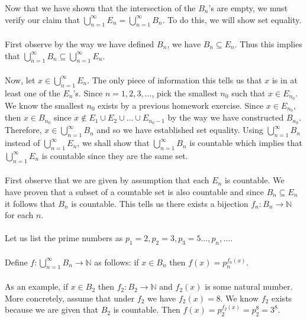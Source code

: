\documentclass[12pt]{article}
\begin{document}
Now that we have shown that the intersection of the $B_{n}$'s are empty, we must verify our claim that $\bigcup^{\infty}_{n=1} E_{n}=\bigcup^{\infty}_{n=1} B_{n}$. To do this, we will show set equality. \\ \\ 

First observe by the way we have defined $B_{n}$, we have $B_{n} \subseteq E_{n}$. Thus this implies that $\bigcup^{\infty}_{n=1} B_{n} \subseteq \bigcup^{\infty}_{n=1} E_{n}$. \\ \\

Now, let $x \in \bigcup^{\infty}_{n=1} E_{n}$. The only piece of information this tells us that $x$ is in at least one of the $E_{n}$'s. Since $n= 1, 2, 3, \ldots$, pick the smallest $n_{0}$ such that $x \in E_{n_{0}}$. We know the smallest $n_{0}$ exists by a previous homework exercise. Since $x \in E_{n_{0}}$, then $x \in B_{n_{0}}$ since $x \notin E_{1} \cup E_{2} \cup \ldots \cup E_{n_{0}-1}$ by the way we have constructed $B_{n_{0}}$. Therefore, $x \in \bigcup^{\infty}_{n=1} B_{n}$ and so we have established set equality. Using $\bigcup^{\infty}_{n=1} B_{n}$ instead of $\bigcup^{\infty}_{n=1} E_{n}$, we shall show that $\bigcup^{\infty}_{n=1} B_{n}$ is countable which implies that $\bigcup^{\infty}_{n=1} E_{n}$ is countable since they are the same set. \\ \\

First observe that we are given by assumption that each $E_{n}$ is countable. We have proven that a subset of a countable set is also countable and since $B_{n} \subseteq E_{n}$ it follows that $B_{n}$ is countable. This tells us there exists a bijection $f_{n}: B_{n} \rightarrow \mathbb{N}$ for each $n$. \\ \\

Let us list the prime numbers as $p_{1}=2, p_{2}=3, p_{3}=5 \ldots, p_{n}, \ldots$. \\ \\

Define $f:\bigcup^{\infty}_{n=1} B_{n} \rightarrow \mathbb{N}$ as follows: if $x \in B_{n}$ then $f(x)= p_{n}^{f_{n}(x)}$. \\ \\

As an example, if $x \in B_{2}$ then $f_{2}: B_{2} \rightarrow \mathbb{N}$ and $f_{2}(x)$ is some natural number. More concretely, assume that under $f_{2}$ we have $f_{2}(x) = 8$. We know $f_{2}$ exists because we are given that $B_{2}$ is countable. Then $f(x)=p_{2}^{f_{2}(x)}=p_{2}^{8}=3^{8}$. \\ \\
\end{document}
